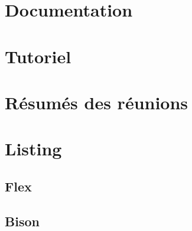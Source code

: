\documentclass[a4paper,11pt]{report}
\begin{document}
\listoffigures
\listoftables
\lstlistoflistings

\appendix

\chapter{Documentation}




\chapter{Tutoriel}



\chapter{Résumés des réunions}









\chapter{Listing}
\section{Flex}
\label{lexer}

\section{Bison}
\label{parser}




\end{document}
